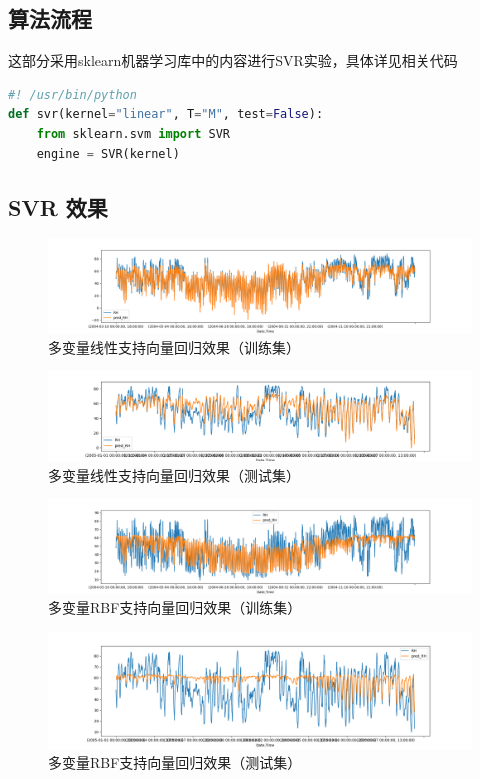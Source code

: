 \documentclass{ctexart}
\begin{document}
\subsection{算法流程}
\begin{info} %
	这部分采用sklearn机器学习库中的内容进行SVR实验，具体详见相关代码
\end{info}

\begin{file}[svr.py]
\begin{lstlisting}[language=Python]
#! /usr/bin/python
def svr(kernel="linear", T="M", test=False):
	from sklearn.svm import SVR
	engine = SVR(kernel)
\end{lstlisting}
\end{file}

\subsection{SVR 效果}
\begin{figure}[H]
	\includegraphics[width=1.2\textwidth]{../images/svr1.png}
	\caption{多变量线性支持向量回归效果（训练集）}
\end{figure}
\begin{figure}[H]
	\includegraphics[width=1.2\textwidth]{../images/svr2.png}
	\caption{多变量线性支持向量回归效果（测试集）}
\end{figure}

\begin{figure}[H]
	\includegraphics[width=1.2\textwidth]{../images/svr3.png}
	\caption{多变量RBF支持向量回归效果（训练集）}
\end{figure}
\begin{figure}[H]
	\includegraphics[width=1.2\textwidth]{../images/svr4.png}
	\caption{多变量RBF支持向量回归效果（测试集）}
\end{figure}
\end{document}
